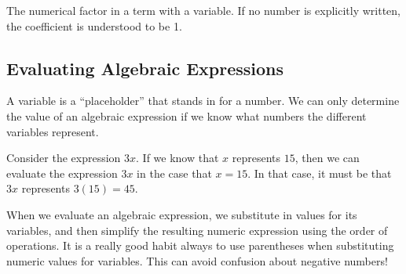 \begin{boxeddef}[Coefficient]
The numerical factor in a term with a variable. If no number is explicitly written, the coefficient is understood to be 1.
\end{boxeddef}

\subsection{Evaluating Algebraic Expressions}

A variable is a ``placeholder'' that stands in for a number. We can only determine the value of an algebraic expression if we know what numbers the different variables represent.

Consider the expression $3x$. If we know that $x$ represents $15$, then we can \gls{evaluate} the expression $3x$ in the case that $x = 15$. In that case, it must be that $3x$ represents $3(15) = 45$.

When we evaluate an algebraic expression, we substitute in values for its variables, and then simplify the resulting numeric expression using the order of operations. It is a really good habit always to use parentheses when substituting numeric values for variables. This can avoid confusion about negative numbers!


